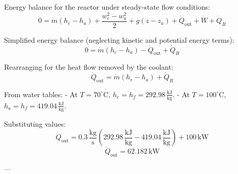 Energy balance for the reactor under steady-state flow conditions:  
\[
0 = \dot{m} \left( h_e - h_a \right) + \frac{w_e^2 - w_a^2}{2} + g \left( z - z_a \right) + \dot{Q}_{\text{out}} + \dot{W} + \dot{Q}_R
\]  

Simplified energy balance (neglecting kinetic and potential energy terms):  
\[
0 = \dot{m} \left( h_e - h_a \right) - \dot{Q}_{\text{out}} + \dot{Q}_R
\]  

Rearranging for the heat flow removed by the coolant:  
\[
\dot{Q}_{\text{out}} = \dot{m} \left( h_e - h_a \right) + \dot{Q}_R
\]  

From water tables:  
- At \( T = 70^\circ\text{C} \), \( h_e = h_f = 292.98 \, \frac{\text{kJ}}{\text{kg}} \).  
- At \( T = 100^\circ\text{C} \), \( h_a = h_f = 419.04 \, \frac{\text{kJ}}{\text{kg}} \).  

Substituting values:  
\[
\dot{Q}_{\text{out}} = 0.3 \, \frac{\text{kg}}{\text{s}} \left( 292.98 \, \frac{\text{kJ}}{\text{kg}} - 419.04 \, \frac{\text{kJ}}{\text{kg}} \right) + 100 \, \text{kW}
\]  
\[
\dot{Q}_{\text{out}} = 62.182 \, \text{kW}
\]  

---